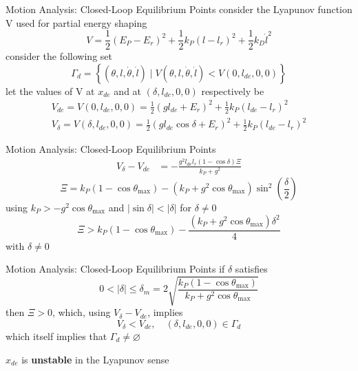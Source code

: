 \documentclass[10pt]{beamer}
\begin{document}
  \begin{frame}{Motion Analysis: Closed-Loop Equilibrium Points}
    consider the Lyapunov function V used for partial energy shaping
    \begin{equation*}
      V = \frac{1}{2}(E_P-E_r)^2+\frac{1}{2}k_P(l-l_r)^2+
        \frac{1}{2}k_D\dot{l}^2
    \end{equation*}
    consider the following set
    \begin{equation*}
      \Gamma_d = \left\{ (\theta, l, \dot{\theta}, \dot{l})
        \mid V(\theta, l, \dot{\theta}, \dot{l}) <
        V(0, l_{de}, 0, 0) \right\}
    \end{equation*}
    let the values of V at $x_{de}$
    and at $(\delta, l_{de}, 0, 0)$ respectively be
    \begin{gather*}
      V_{de} = V(0, l_{de}, 0, 0) = \frac{1}{2}(g l_{de} + E_r)^2
        + \frac{1}{2} k_P (l_{de} - l_r)^2 \\
      V_\delta = V(\delta, l_{de}, 0, 0) = \frac{1}{2}(g l_{de}
        \cos\delta + E_r)^2 + \frac{1}{2} k_P (l_{de} - l_r)^2
    \end{gather*}
  \end{frame}

  \begin{frame}{Motion Analysis: Closed-Loop Equilibrium Points}
    \begin{align*}
      V_\delta - V_{de} %
        &= -\frac{g^2 l_{de} l_r (1-\cos\delta) \Xi}{k_P+g^2}
    \end{align*}
    \begin{equation*}
        \Xi = k_P(1-\cos\theta_{\max})-(k_P+g^2\cos\theta_{\max})
            \sin^2 \left( \frac{\delta}{2} \right)
    \end{equation*}
    using $k_P > -g^2\cos\theta_{\max}$ and
    $|\sin \delta|<|\delta|$ for $\delta \neq 0$
    \begin{equation*}
      \Xi > k_P(1-\cos\theta_{\max})-
        \frac{(k_P+g^2\cos\theta_{\max})\delta^2}{4}
    \end{equation*}
    with $\delta \neq 0$
  \end{frame}

  \begin{frame}{Motion Analysis: Closed-Loop Equilibrium Points}
    if $\delta$ satisfies
    \begin{equation*}
      0 < |\delta| \le \delta_m = 2
        \sqrt{\frac{k_P(1-\cos\theta_{\max})}{k_P+g^2\cos\theta_{\max}}}
    \end{equation*}
    then $\Xi>0$,
    which, using $V_\delta - V_{de}$, implies
    \begin{equation*}
      V_\delta < V_{de}, \quad (\delta, l_{de}, 0, 0) \in \Gamma_d
    \end{equation*}
    which itself implies %
    that $\Gamma_d \neq \varnothing$

    $x_{de}$ is \textbf{unstable} in the Lyapunov sense
  \end{frame}
\end{document}
